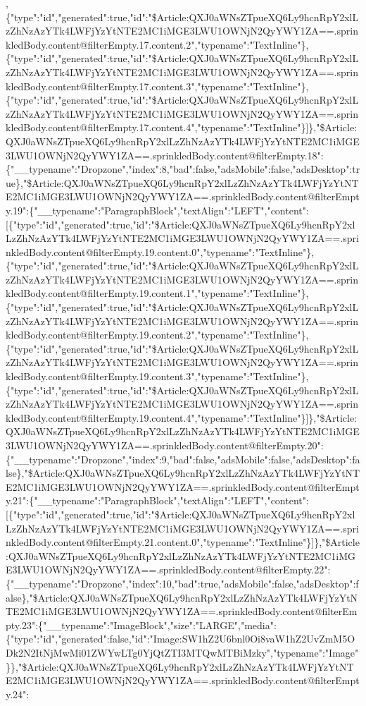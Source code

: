 ,\{"type":"id","generated":true,"id":"\$Article:QXJ0aWNsZTpueXQ6Ly9hcnRpY2xlLzZhNzAzYTk4LWFjYzYtNTE2MC1iMGE3LWU1OWNjN2QyYWY1ZA==.sprinkledBody.content@filterEmpty.17.content.2","typename":"TextInline"\},\{"type":"id","generated":true,"id":"\$Article:QXJ0aWNsZTpueXQ6Ly9hcnRpY2xlLzZhNzAzYTk4LWFjYzYtNTE2MC1iMGE3LWU1OWNjN2QyYWY1ZA==.sprinkledBody.content@filterEmpty.17.content.3","typename":"TextInline"\},\{"type":"id","generated":true,"id":"\$Article:QXJ0aWNsZTpueXQ6Ly9hcnRpY2xlLzZhNzAzYTk4LWFjYzYtNTE2MC1iMGE3LWU1OWNjN2QyYWY1ZA==.sprinkledBody.content@filterEmpty.17.content.4","typename":"TextInline"\}{]}\},"\$Article:QXJ0aWNsZTpueXQ6Ly9hcnRpY2xlLzZhNzAzYTk4LWFjYzYtNTE2MC1iMGE3LWU1OWNjN2QyYWY1ZA==.sprinkledBody.content@filterEmpty.18":\{"\_\_typename":"Dropzone","index":8,"bad":false,"adsMobile":false,"adsDesktop":true\},"\$Article:QXJ0aWNsZTpueXQ6Ly9hcnRpY2xlLzZhNzAzYTk4LWFjYzYtNTE2MC1iMGE3LWU1OWNjN2QyYWY1ZA==.sprinkledBody.content@filterEmpty.19":\{"\_\_typename":"ParagraphBlock","textAlign":"LEFT","content":{[}\{"type":"id","generated":true,"id":"\$Article:QXJ0aWNsZTpueXQ6Ly9hcnRpY2xlLzZhNzAzYTk4LWFjYzYtNTE2MC1iMGE3LWU1OWNjN2QyYWY1ZA==.sprinkledBody.content@filterEmpty.19.content.0","typename":"TextInline"\},\{"type":"id","generated":true,"id":"\$Article:QXJ0aWNsZTpueXQ6Ly9hcnRpY2xlLzZhNzAzYTk4LWFjYzYtNTE2MC1iMGE3LWU1OWNjN2QyYWY1ZA==.sprinkledBody.content@filterEmpty.19.content.1","typename":"TextInline"\},\{"type":"id","generated":true,"id":"\$Article:QXJ0aWNsZTpueXQ6Ly9hcnRpY2xlLzZhNzAzYTk4LWFjYzYtNTE2MC1iMGE3LWU1OWNjN2QyYWY1ZA==.sprinkledBody.content@filterEmpty.19.content.2","typename":"TextInline"\},\{"type":"id","generated":true,"id":"\$Article:QXJ0aWNsZTpueXQ6Ly9hcnRpY2xlLzZhNzAzYTk4LWFjYzYtNTE2MC1iMGE3LWU1OWNjN2QyYWY1ZA==.sprinkledBody.content@filterEmpty.19.content.3","typename":"TextInline"\},\{"type":"id","generated":true,"id":"\$Article:QXJ0aWNsZTpueXQ6Ly9hcnRpY2xlLzZhNzAzYTk4LWFjYzYtNTE2MC1iMGE3LWU1OWNjN2QyYWY1ZA==.sprinkledBody.content@filterEmpty.19.content.4","typename":"TextInline"\}{]}\},"\$Article:QXJ0aWNsZTpueXQ6Ly9hcnRpY2xlLzZhNzAzYTk4LWFjYzYtNTE2MC1iMGE3LWU1OWNjN2QyYWY1ZA==.sprinkledBody.content@filterEmpty.20":\{"\_\_typename":"Dropzone","index":9,"bad":false,"adsMobile":false,"adsDesktop":false\},"\$Article:QXJ0aWNsZTpueXQ6Ly9hcnRpY2xlLzZhNzAzYTk4LWFjYzYtNTE2MC1iMGE3LWU1OWNjN2QyYWY1ZA==.sprinkledBody.content@filterEmpty.21":\{"\_\_typename":"ParagraphBlock","textAlign":"LEFT","content":{[}\{"type":"id","generated":true,"id":"\$Article:QXJ0aWNsZTpueXQ6Ly9hcnRpY2xlLzZhNzAzYTk4LWFjYzYtNTE2MC1iMGE3LWU1OWNjN2QyYWY1ZA==.sprinkledBody.content@filterEmpty.21.content.0","typename":"TextInline"\}{]}\},"\$Article:QXJ0aWNsZTpueXQ6Ly9hcnRpY2xlLzZhNzAzYTk4LWFjYzYtNTE2MC1iMGE3LWU1OWNjN2QyYWY1ZA==.sprinkledBody.content@filterEmpty.22":\{"\_\_typename":"Dropzone","index":10,"bad":true,"adsMobile":false,"adsDesktop":false\},"\$Article:QXJ0aWNsZTpueXQ6Ly9hcnRpY2xlLzZhNzAzYTk4LWFjYzYtNTE2MC1iMGE3LWU1OWNjN2QyYWY1ZA==.sprinkledBody.content@filterEmpty.23":\{"\_\_typename":"ImageBlock","size":"LARGE","media":\{"type":"id","generated":false,"id":"Image:SW1hZ2U6bnl0Oi8vaW1hZ2UvZmM5ODk2N2ItNjMwMi01ZWYwLTg0YjQtZTI3MTQwMTBiMzky","typename":"Image"\}\},"\$Article:QXJ0aWNsZTpueXQ6Ly9hcnRpY2xlLzZhNzAzYTk4LWFjYzYtNTE2MC1iMGE3LWU1OWNjN2QyYWY1ZA==.sprinkledBody.content@filterEmpty.24":